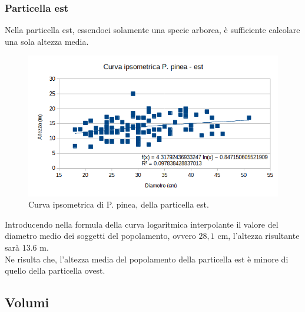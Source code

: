 \subsubsection*{Particella est}
Nella particella est, essendoci solamente una specie arborea, è sufficiente calcolare una sola altezza media.
\begin{figure}[H]
    \centering
    \includegraphics[width=0.7 \textwidth]{immagini/ipsom_pinea_est.png}
    \caption{Curva ipsometrica di P. pinea, della particella est.}
    \label{fig:ipsom_pinea_est}
\end{figure}
Introducendo nella formula della curva logaritmica interpolante il valore del diametro medio dei soggetti del popolamento, ovvero $28,1$ cm, l'altezza risultante sarà $13.6$ m.\\
Ne risulta che, l'altezza media del popolamento della particella est è minore di quello della particella ovest.
\subsection{Volumi}
